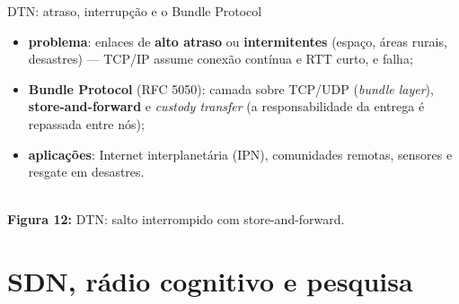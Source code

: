 \documentclass[aspectratio=169,11pt]{beamer}
\begin{document}
\begin{frame}{DTN: atraso, interrupção e o Bundle Protocol}
  \begin{itemize}
    \item \textbf{problema}: enlaces de \textbf{alto atraso} ou \textbf{intermitentes} (espaço, áreas rurais, desastres) --- TCP/IP assume conexão contínua e RTT curto, e falha;
    \item \textbf{Bundle Protocol} (RFC 5050): camada sobre TCP/UDP (\emph{bundle layer}), \textbf{store-and-forward} e \emph{custody transfer} (a responsabilidade da entrega é repassada entre nós);
    \item \textbf{aplicações}: Internet interplanetária (IPN), comunidades remotas, sensores e resgate em desastres.
  \end{itemize}
  \begin{center}
    \\[1mm]
    {\scriptsize \textbf{Figura 12:} DTN: salto interrompido com store-and-forward.}
  \end{center}
\end{frame}

\section{SDN, rádio cognitivo e pesquisa}
\end{document}
